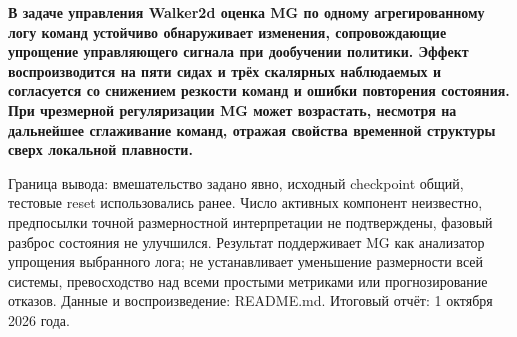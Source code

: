 \documentclass[10pt,a4paper]{article}
\begin{document}
\textbf{В задаче управления Walker2d оценка MG по одному агрегированному логу команд устойчиво обнаруживает изменения, сопровождающие упрощение управляющего сигнала при дообучении политики. Эффект воспроизводится на пяти сидах и трёх скалярных наблюдаемых и согласуется со снижением резкости команд и ошибки повторения состояния. При чрезмерной регуляризации MG может возрастать, несмотря на дальнейшее сглаживание команд, отражая свойства временной структуры сверх локальной плавности.}

Граница вывода: вмешательство задано явно, исходный checkpoint общий, тестовые reset использовались ранее. Число активных компонент неизвестно, предпосылки точной размерностной интерпретации не подтверждены, фазовый разброс состояния не улучшился. Результат поддерживает MG как анализатор упрощения выбранного лога; не устанавливает уменьшение размерности всей системы, превосходство над всеми простыми метриками или прогнозирование отказов. Данные и воспроизведение: README.md. Итоговый отчёт: 1 октября 2026 года.
\end{document}
